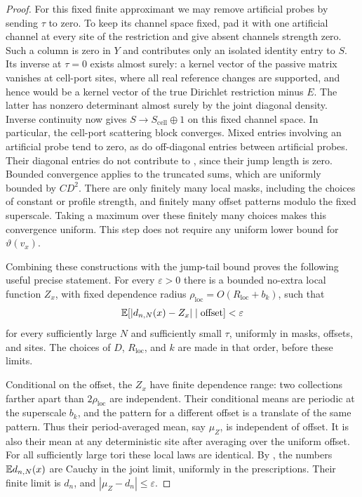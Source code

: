 \begin{proof}
For this fixed finite approximant we may remove artificial probes
by sending $\tau$ to zero. To keep its channel space fixed, pad it
with one artificial channel at every site of the restriction and
give absent channels strength zero. Such a column is zero in $Y$
and contributes only an isolated identity entry to $S$.
Its inverse at $\tau=0$ exists almost
surely: a kernel vector of the passive matrix vanishes at cell-port
sites, where all real reference changes are supported, and hence
would be a kernel vector of the true Dirichlet restriction minus
$E$. The latter has nonzero determinant almost surely by the joint
diagonal density. Inverse continuity now gives
$S\to S_{\mathrm{cell}}\oplus1$ on this fixed channel space.
In particular, the cell-port scattering block converges.
Mixed entries involving an artificial
probe tend to zero, as do off-diagonal entries between artificial
probes. Their diagonal entries do not contribute to
, since their jump length is zero.
Bounded convergence applies to the truncated sums, which are
uniformly bounded by $CD^2$.
There are only finitely many local masks, including the choices of
constant or profile strength, and finitely many offset patterns
modulo the fixed superscale. Taking a maximum over these finitely
many choices makes this convergence uniform. This step does not
require any uniform lower bound for $\vartheta(v_x)$.

Combining these constructions with the jump-tail bound proves the
following useful precise statement. For every $\varepsilon>0$ there
is a bounded no-extra local function $Z_x$, with fixed dependence
radius $\rho_{\mathrm{loc}}=O(R_{\mathrm{loc}}+b_k)$, such that
\begin{equation}
 \mathbb E[|d_{n,N}(x)-Z_x|\mid\text{offset}]<\varepsilon
 \label{screen:local-approximation}
\end{equation}
for every sufficiently large $N$ and sufficiently small $\tau$,
uniformly in masks, offsets, and sites. The choices of $D$,
$R_{\mathrm{loc}}$, and $k$ are made in that order, before these
limits.

Conditional on the offset, the $Z_x$ have finite dependence range:
two collections farther apart than $2\rho_{\mathrm{loc}}$ are
independent. Their conditional means are periodic at the superscale
$b_k$, and the pattern for a different offset is a translate of the
same pattern. Thus their period-averaged mean, say $\mu_Z$, is
independent of offset. It is also their mean at any deterministic
site after averaging over the uniform offset. For all sufficiently
large tori these local laws are identical. By
, the numbers
$\mathbb E d_{n,N}(x)$ are Cauchy in the joint limit, uniformly in the
prescriptions. Their finite limit is $d_n$, and
$|\mu_Z-d_n|\leq\varepsilon$.


\end{proof}

